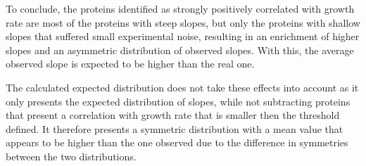 \documentclass[10pt,letterpaper]{article}
\begin{document}
To conclude, the proteins identified as strongly positively correlated with growth rate are most of the proteins with steep slopes, but only the proteins with shallow slopes that suffered small experimental noise, resulting in an enrichment of higher slopes and an asymmetric distribution of observed slopes.
With this, the average observed slope is expected to be higher than the real one.

The calculated expected distribution does not take these effects into account as it only presents the expected distribution of slopes, while not subtracting proteins that present a correlation with growth rate that is smaller then the threshold defined.
It therefore presents a symmetric distribution with a mean value that appears to be higher than the one observed due to the difference in symmetries between the two distributions.
\end{document}
